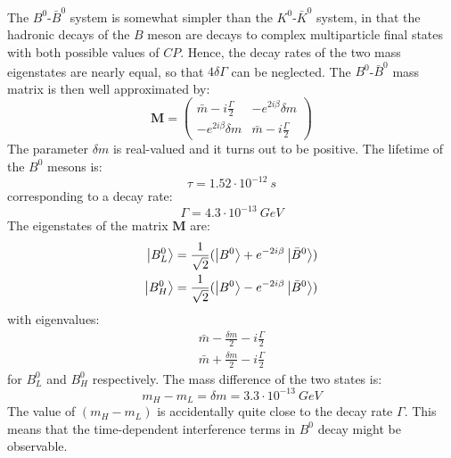 \documentclass[../../main/main.tex]{subfiles}
\begin{document}
The \( B^0 \)-\( \bar{B}^0 \) system is somewhat simpler than the \( K^0 \)-\( \bar{K}^0 \) system, in that the hadronic decays of the \( B \) meson are decays to complex multiparticle final states with both possible values of \( CP \). Hence, the decay rates of the two mass eigenstates are nearly equal, so that \( 4 \delta \Gamma \) can be neglected. The \( B^0 \)-\( \bar{B}^0 \) mass matrix is then well approximated by:
\begin{equation}
	\mathbf{M}
	=
	\begin{pmatrix}
		\bar{m} - i \frac{\Gamma}{2}	&	- e^{2 i \beta} \delta m	\\
		- e^{2 i \beta} \delta m	&	\bar{m} - i \frac{\Gamma}{2}
	\end{pmatrix}
	\label{eq:}
\end{equation}
The parameter \( \delta m \) is real-valued and it turns out to be positive. The lifetime of the \( B^0 \) mesons is:
\begin{equation}
	\tau
	=
	1.52 \cdot 10^{-12} \ \si{s}
	\label{eq:}
\end{equation}
corresponding to a decay rate:
\begin{equation}
	\Gamma
	=
	4.3 \cdot 10^{-13} \ \si{GeV}
	\label{eq:}
\end{equation}
The eigenstates of the matrix \( \mathbf{M} \) are:
\begin{align}
	\ket{B^0_L}	&= \frac{1}{\sqrt{2}} ( \ket{B^0} + e^{-2i\beta} \ket{\bar{B}^0} )	\\
	\ket{B^0_H}	&= \frac{1}{\sqrt{2}} ( \ket{B^0} - e^{-2i\beta} \ket{\bar{B}^0} )
\end{align}
with eigenvalues:
\begin{align}
	\bar{m} - \frac{\delta m}{2} - i \frac{\Gamma}{2}	\\
	\bar{m} + \frac{\delta m}{2} - i \frac{\Gamma}{2}
\end{align}
for \( B^0_L \) and \( B^0_H \) respectively. The mass difference of the two states is:
\begin{equation}
	m_H - m_L
	=
	\delta m
	=
	3.3 \cdot 10^{-13} \ \si{GeV}
	\label{eq:}
\end{equation}
The value of \( (m_H - m_L) \) is accidentally quite close to the decay rate \( \Gamma \). This means that the time-dependent interference terms in \( B^0 \) decay might be observable.
\end{document}
